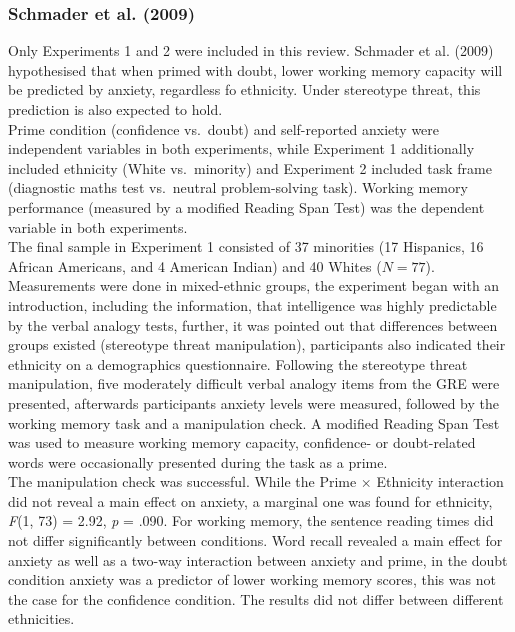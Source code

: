 \documentclass[
  stu,floatsintext]{apa7}
\begin{document}
\subsubsection{Schmader et al. (2009)}\label{schmadermetacognitiveperspectivecognitive2009}

Only Experiments 1 and 2 were included in this review.
Schmader et al. (2009) hypothesised that when primed with doubt, lower working memory capacity will be predicted by anxiety, regardless fo ethnicity.
Under stereotype threat, this prediction is also expected to hold.\\
Prime condition (confidence vs.~doubt) and self-reported anxiety were independent variables in both experiments, while Experiment 1 additionally included ethnicity (White vs.~minority) and Experiment 2 included task frame (diagnostic maths test vs.~neutral problem-solving task).
Working memory performance (measured by a modified Reading Span Test) was the dependent variable in both experiments.\\
The final sample in Experiment 1 consisted of 37 minorities (17 Hispanics, 16 African Americans, and 4 American Indian) and 40 Whites (\(N = 77\)).
Measurements were done in mixed-ethnic groups, the experiment began with an introduction, including the information, that intelligence was highly predictable by the verbal analogy tests, further, it was pointed out that differences between groups existed (stereotype threat manipulation), participants also indicated their ethnicity on a demographics questionnaire.
Following the stereotype threat manipulation, five moderately difficult verbal analogy items from the GRE were presented, afterwards participants anxiety levels were measured, followed by the working memory task and a manipulation check.
A modified Reading Span Test was used to measure working memory capacity, confidence- or doubt-related words were occasionally presented during the task as a prime.\\
The manipulation check was successful.
While the Prime \(\times\) Ethnicity interaction did not reveal a main effect on anxiety, a marginal one was found for ethnicity, \emph{F}(1, 73) = 2.92, \emph{p} = .090.
For working memory, the sentence reading times did not differ significantly between conditions.
Word recall revealed a main effect for anxiety as well as a two-way interaction between anxiety and prime, in the doubt condition anxiety was a predictor of lower working memory scores, this was not the case for the confidence condition.
The results did not differ between different ethnicities.\\
\end{document}
